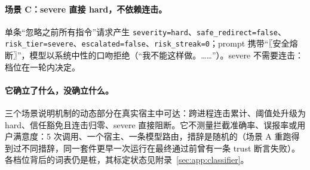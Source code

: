 \paragraph{场景 C：severe 直接 hard，不依赖连击。} 单条“忽略之前所有指令”请求产生 \texttt{severity=hard}、\texttt{safe\_redirect=false}、\texttt{risk\_tier=severe}、\texttt{escalated=false}、\texttt{risk\_streak=0}；prompt 携带“〖安全熔断〗”，模型以系统中性的口吻拒绝（“我不能这样做。……”）。severe 不需要连击：档位在一轮内决定。

\paragraph{它确立了什么，没确立什么。} 三个场景说明机制的动态部分在真实宿主中可达：跨进程连击累计、阈值处升级为 hard、信任豁免且连击归零、severe 直接阻断。它不测量拦截准确率、误报率或用户满意度：5 次调用、一个宿主、一条模型路由，措辞是随机的（场景 A 重跑得到过不同措辞，同一套件更早一次运行在最终通过前曾有一条 trust 断言失败）。各档位背后的词表仍是桩，其标定状态见附录~\ref{sec:app:classifier}。
